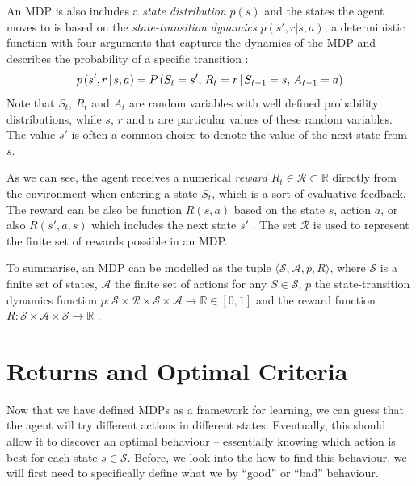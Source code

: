 An MDP is also includes a \textit{state distribution} $p(s)$ and the states the agent moves to is based on the \textit{state-transition dynamics} $p(s',r|s, a)$, a deterministic function with four arguments that captures the dynamics of the MDP and describes the probability of a specific transition \cite{suttonAndBartoBook}:
\begin{equation}
    p\hspace{0.5mm} (s',r \hspace{0.5mm}|\hspace{0.5mm} s, a) = P \hspace{0.5mm} (S_t = s', \hspace{0.5mm}R_t = r \hspace{0.5mm}|\hspace{0.5mm} S_{t-1} = s,\hspace{0.5mm} A_{t-1} = a )
\end{equation}
Note that $S_t$, $R_t$ and $A_t$ are random variables with well defined probability distributions, while $s$, $r$ and $a$ are particular values of these random variables. The value $s'$ is often a common choice to denote the value of the next state from $s$.

As we can see, the agent receives a numerical \textit{reward} $R_t \in \mathcal{R} \subset \mathbb{R}$ directly from the environment when entering a state $S_t$, which is a sort of evaluative feedback. The reward can be also be function $R(s,a)$ based on the state $s$, action $a$, or also $R(s',a,s)$ which includes the next state $s'$ \cite{TTK23, RLinRoboticsSurvey}. The set $\mathcal{R}$ is used to represent the finite set of rewards possible in an MDP.

To summarise, an MDP can be modelled as the tuple $\langle \mathcal{S},\mathcal{A}, p, R \rangle$, where $\mathcal{S}$ is a finite set of states, $\mathcal{A}$ the finite set of actions for any $S \in \mathcal{S}$, $p$ the state-transition dynamics function $p : \mathcal{S} \times \mathcal{R} \times \mathcal{S} \times \mathcal{A} \rightarrow \mathbb{R} \in [0,1]$  and the reward function $ R : \mathcal{S} \times \mathcal{A} \times \mathcal{S} \rightarrow \mathbb{R}$ \cite{TTK23}.

\section{Returns and Optimal Criteria}
\label{sec:2_ReturnsAndOptimalCriteria}

Now that we have defined MDPs as a framework for learning, we can guess that the agent will try different actions in different states. Eventually, this should allow it to discover an optimal behaviour -- essentially knowing which action is best for each state $s \in \mathcal{S}$. Before, we look into the how to find this behaviour, we will first need to specifically define what we by ``good'' or ``bad'' behaviour.

